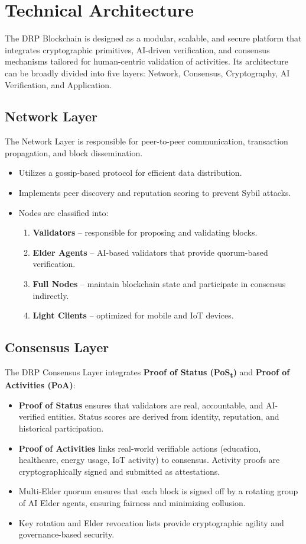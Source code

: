 \documentclass[11pt,a4paper]{article}
\begin{document}
\section{Technical Architecture}

The DRP Blockchain is designed as a modular, scalable, and secure platform that integrates cryptographic primitives, AI-driven verification, and consensus mechanisms tailored for human-centric validation of activities. Its architecture can be broadly divided into five layers: Network, Consensus, Cryptography, AI Verification, and Application.

\subsection{Network Layer}
The Network Layer is responsible for peer-to-peer communication, transaction propagation, and block dissemination.  
\begin{itemize}
    \item Utilizes a gossip-based protocol for efficient data distribution.  
    \item Implements peer discovery and reputation scoring to prevent Sybil attacks.  
    \item Nodes are classified into:
        \begin{enumerate}
            \item \textbf{Validators} – responsible for proposing and validating blocks.  
            \item \textbf{Elder Agents} – AI-based validators that provide quorum-based verification.  
            \item \textbf{Full Nodes} – maintain blockchain state and participate in consensus indirectly.  
            \item \textbf{Light Clients} – optimized for mobile and IoT devices.  
        \end{enumerate}
\end{itemize}

\subsection{Consensus Layer}
The DRP Consensus Layer integrates \textbf{Proof of Status (PoS\textsubscript{t})} and \textbf{Proof of Activities (PoA)}:
\begin{itemize}
    \item \textbf{Proof of Status} ensures that validators are real, accountable, and AI-verified entities. Status scores are derived from identity, reputation, and historical participation.  
    \item \textbf{Proof of Activities} links real-world verifiable actions (education, healthcare, energy usage, IoT activity) to consensus. Activity proofs are cryptographically signed and submitted as attestations.  
    \item Multi-Elder quorum ensures that each block is signed off by a rotating group of AI Elder agents, ensuring fairness and minimizing collusion.  
    \item Key rotation and Elder revocation lists provide cryptographic agility and governance-based security.  
\end{itemize}
\end{document}

